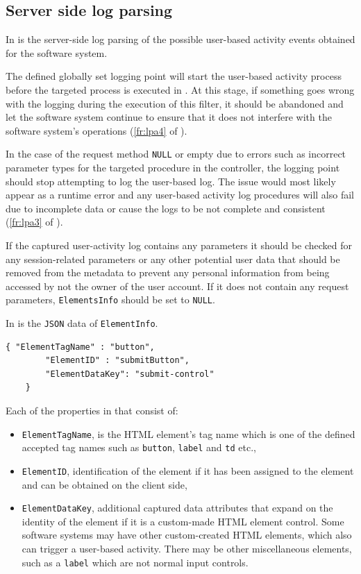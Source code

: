 \subsection{Server side log parsing}
In  is the server-side log parsing of the possible user-based activity events obtained for the software system.\par The defined globally set logging point will start the user-based activity process before the targeted process is executed in . At this stage, if something goes wrong with the logging during the execution of this filter, it should be abandoned and let the software system continue to ensure that it does not interfere with the software system's operations (\ref{fr:lpa4} of ).\par In the case of the request method \texttt{NULL} or empty due to errors such as incorrect parameter types for the targeted procedure in the controller, the logging point should stop attempting to log the user-based log. The issue would most likely appear as a runtime error and any user-based activity log procedures will also fail due to incomplete data or cause the logs to be not complete and consistent (\ref{fr:lpa3} of ).\par If the captured user-activity log contains any parameters it should be checked for any session-related parameters or any other potential user data that should be removed from the metadata to prevent any personal information from being accessed by not the owner of the user account. If it does not contain any request parameters, \texttt{ElementsInfo} should be set to \texttt{NULL}.\par In  is the \texttt{JSON} data of \texttt{ElementInfo}. 

\begin{lstlisting}[style=json, caption={\textit{Element properties JSON}}, label={fig:Ch2_ElementInfo}] 
	{ "ElementTagName" : "button",
		"ElementID" : "submitButton",
		"ElementDataKey": "submit-control"		
	}
\end{lstlisting}

Each of the properties in  that consist of:

\begin{itemize}
	\item \texttt{ElementTagName}, is the HTML element's tag name which is one of the defined accepted tag names such as \texttt{button}, \texttt{label} and \texttt{td} etc.,
	\item \texttt{ElementID}, identification of the element if it has been assigned to the element and can be obtained on the client side,
	\item \texttt{ElementDataKey}, additional captured data attributes that expand on the identity of the element if it is a custom-made HTML element control. Some software systems may have other custom-created HTML elements, which also can trigger a user-based activity. There may be other miscellaneous elements, such as a \texttt{label} which are not normal input controls.
\end{itemize}

